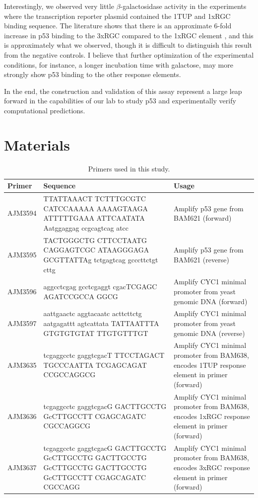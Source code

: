 Interestingly, we observed very little \(\beta\)-galactosidase activity in the experiments where the transcription reporter plasmid contained the 1TUP and 1xRGC binding sequence. The literature shows that there is an approximate \num{6}-fold increase in p53 binding to the 3xRGC compared to the 1xRGC element \parencite{scharerMammalianP53Can1992}, and this is approximately what we observed, though it is difficult to distinguish this result from the negative controls. I believe that further optimization of the experimental conditions, for instance, a longer incubation time with galactose, may more strongly show p53 binding to the other response elements.

In the end, the construction and validation of this assay represent a large leap forward in the capabilities of our lab to study p53 and experimentally verify computational predictions.

\section{Materials}

\begin{table}[H]
\centering
\renewcommand{\arraystretch}{1.2}
{
\begin{tabularx}{\textwidth}{|p{1.8cm}|Y|p{4.5cm}|}
\hline
Primer & Sequence & Usage \\
\hline
AJM3594 & TTATTAAACT TCTTTGCGTC CATCCAAAAA AAAAGTAAGA ATTTTTGAAA ATTCAATATA Aatggaggag ccgcagtcag atcc & Amplify p53 gene from BAM621 (forward) \\
\hline
AJM3595 & TACTGGGCTG CTTCCTAATG CAGGAGTCGC ATAAGGGAGA GCGTTATTAg tctgagtcag gcccttctgt cttg & Amplify p53 gene from BAM621 (reverse) \\
\hline
AJM3596 & aggcctcgag gcctcgaggt cgacTCGAGC AGATCCGCCA GGCG & Amplify CYC1 minimal promoter from yeast genomic DNA (forward) \\
\hline
AJM3597 & aattgaactc aggtacaatc acttcttctg aatgagattt agtcattata TATTAATTTA GTGTGTGTAT TTGTGTTTGT & Amplify CYC1 minimal promoter from yeast genomic DNA (reverse) \\
\hline
AJM3635 & tcgaggcctc gaggtcgacT TTCCTAGACT TGCCCAATTA TCGAGCAGAT CCGCCAGGCG & Amplify CYC1 minimal promoter from BAM638, encodes 1TUP response element in primer (forward) \\
\hline
AJM3636 & tcgaggcctc gaggtcgacG GACTTGCCTG GcCTTGCCTT CGAGCAGATC CGCCAGGCG & Amplify CYC1 minimal promoter from BAM638, encodes 1xRGC response element in primer (forward) \\
\hline
AJM3637 & tcgaggcctc gaggtcgacG GACTTGCCTG GcCTTGCCTG GACTTGCCTG GcCTTGCCTG GACTTGCCTG GcCTTGCCTT CGAGCAGATC CGCCAGG & Amplify CYC1 minimal promoter from BAM638, encodes 3xRGC response element in primer (forward) \\
\hline
\end{tabularx}
}
\caption[Primer Table]{Primers used in this study.}
\label{tab:primers}
\end{table}

